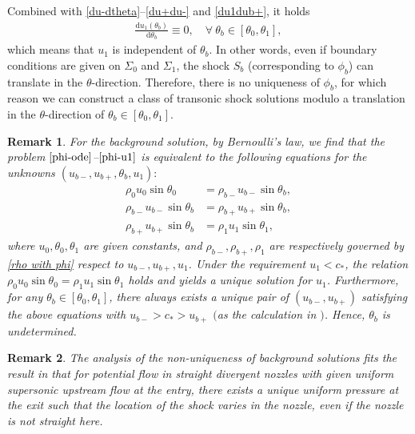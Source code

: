 \documentclass[10pt,a4paper]{amsart}
\newcommand{\dd}{\mathrm{d}}
\newtheorem{remark}{Remark}[section]
\numberwithin{equation}{section}
\begin{document}
Combined with \eqref{du-dtheta}--\eqref{du+du-} and \eqref{du1dub+}, it holds
	\begin{align}
		\frac{\dd u_1(\theta_b)}{\dd \theta_b }\equiv 0, \quad\forall ~\theta_b\in [\theta_0, \theta_1],
	\end{align}
which means that $u_1$ is independent of  $\theta_b$. In other words, even if boundary conditions are given on $\Sigma_0$ and $\Sigma_1$, the shock  $S_b$ (corresponding to $\phi_b$) can translate in the  $\theta$-direction. Therefore, there is no uniqueness of $\phi_b$, for which reason we can construct a class of transonic shock solutions modulo a translation in the $ \theta$-direction of $\theta_b\in[\theta_0,\theta_1]$. 
\begin{remark}\label{keypoint}
   For the background solution, by Bernoulli's law, we find that the problem $\eqref{phi-ode}$--$\eqref{phi-u1}$ is equivalent to the following equations for the unknowns $(u_{b-},u_{b+},\theta_b, u_1):$
		\begin{align*}
		\rho_0u_0\sin\theta_0&=\rho_{b-}u_{b-}\sin\theta_b,\\
        \rho_{b-}u_{b-}\sin\theta_b&=\rho_{b+}u_{b+}\sin\theta_b,\\
			\rho_{b+}u_{b+}\sin\theta_b&=\rho_1u_1\sin\theta_1,   
		\end{align*}			
    where $u_0, \theta_0, \theta_1$ are given constants, and $\rho_{b-}, \rho_{b+}, \rho_1$ are respectively governed by \eqref{rho with phi} respect to $u_{b-}, u_{b+}, u_1$. Under the requirement $u_1<c_*$, the relation $\rho_0u_0\sin\theta_0=\rho_1u_1\sin\theta_1$ holds and yields a unique solution for $u_1$. Furthermore, for any $\theta_b\in[\theta_0,\theta_1]$, there always exists a unique pair of  $(u_{b-},u_{b+})$ satisfying the above equations with $u_{b-}>c_*>u_{b+}$ $($as the calculation in \cite[Lemma 2.1]{tssCF}$)$. Hence, $\theta_b$ is undetermined.
	\end{remark}
\begin{remark}
    The analysis of the non-uniqueness of background solutions fits the result in \cite{tssCF} that for potential flow in straight divergent nozzles with given uniform supersonic upstream flow at the entry, there exists a unique uniform pressure at the exit such that the location of the shock varies in the nozzle, even if the nozzle is not straight here.
\end{remark}
    
\end{document}
